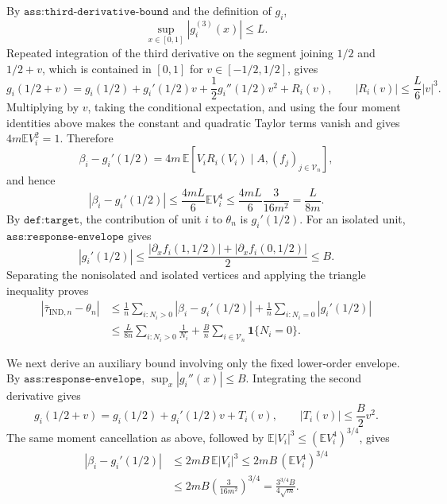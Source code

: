 By \(\texttt{ass:third-derivative-bound}\) and the definition of \(g_i\),
\[
 \sup_{x\in[0,1]}\left|g_i^{(3)}(x)\right|\le L.
\]
Repeated integration of the third derivative on the segment joining \(1/2\) and \(1/2+v\), which is contained in \([0,1]\) for \(v\in[-1/2,1/2]\), gives
\[
 g_i(1/2+v)
 =g_i(1/2)+g_i'(1/2)v+\frac12g_i''(1/2)v^2+R_i(v),
 \qquad
 |R_i(v)|\le\frac L6|v|^3.
\]
Multiplying by \(v\), taking the conditional expectation, and using the four moment identities above makes the constant and quadratic Taylor terms vanish and gives \(4m\mathbb E V_i^2=1\). Therefore
\[
 \beta_i-g_i'(1/2)
 =4m\,\mathbb E\!\left[V_iR_i(V_i)\mid A,(f_j)_{j\in\mathcal V_n}\right],
\]
and hence
\[
 \left|\beta_i-g_i'(1/2)\right|
 \le \frac{4mL}{6}\mathbb E V_i^4
 \le \frac{4mL}{6}\frac3{16m^2}
 =\frac{L}{8m}.
\]
By \(\texttt{def:target}\), the contribution of unit \(i\) to \(\theta_n\) is \(g_i'(1/2)\). For an isolated unit, \(\texttt{ass:response-envelope}\) gives
\[
 |g_i'(1/2)|
 \le\frac{|\partial_xf_i(1,1/2)|+|\partial_xf_i(0,1/2)|}{2}
 \le B.
\]
Separating the nonisolated and isolated vertices and applying the triangle inequality proves
\[
\begin{aligned}
 \left|\bar\tau_{\mathrm{IND},n}-\theta_n\right|
 &\le \frac1n\sum_{i:N_i>0}\left|\beta_i-g_i'(1/2)\right|
 +\frac1n\sum_{i:N_i=0}|g_i'(1/2)|\\
 &\le \frac{L}{8n}\sum_{i:N_i>0}\frac1{N_i}
 +\frac Bn\sum_{i\in\mathcal V_n}\mathbf1\{N_i=0\}.
\end{aligned}
\]

We next derive an auxiliary bound involving only the fixed lower-order envelope. By \(\texttt{ass:response-envelope}\), \(\sup_x|g_i''(x)|\le B\). Integrating the second derivative gives
\[
 g_i(1/2+v)=g_i(1/2)+g_i'(1/2)v+T_i(v),
 \qquad
 |T_i(v)|\le\frac B2v^2.
\]
The same moment cancellation as above, followed by \(\mathbb E|V_i|^3\le(\mathbb EV_i^4)^{3/4}\), gives
\[
\begin{aligned}
 |\beta_i-g_i'(1/2)|
 &\le 2mB\,\mathbb E|V_i|^3
 \le 2mB\,(\mathbb E V_i^4)^{3/4}\\
 &\le 2mB\left(\frac3{16m^2}\right)^{3/4}
 =\frac{3^{3/4}B}{4\sqrt m}.
\end{aligned}
\]

